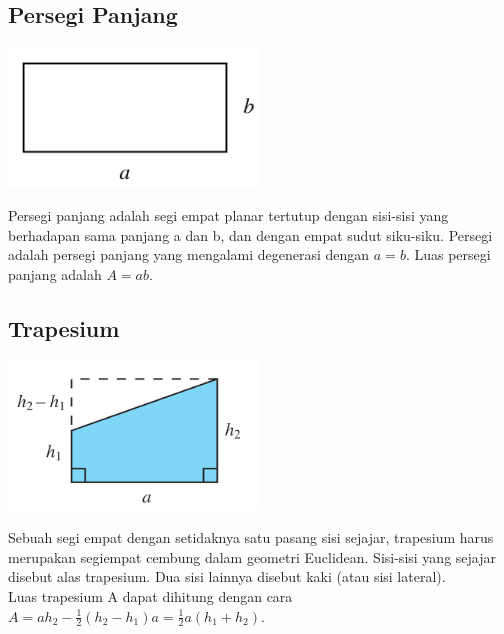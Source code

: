 \subsection{Persegi Panjang}
\begin{center}
	\includegraphics[width=0.50\textwidth]{gambar/persegipanjangpustaka.png}
\end{center}
Persegi panjang adalah segi empat planar tertutup dengan sisi-sisi yang berhadapan sama panjang a dan b, dan dengan empat sudut siku-siku. Persegi adalah persegi panjang yang mengalami degenerasi dengan $a = b$. Luas persegi panjang adalah $A = ab$.\citep{Rectangl23:online}

\subsection{Trapesium}
\begin{center}
	\includegraphics[width=0.50\textwidth]{gambar/trapesiumpustaka.png}
\end{center}
Sebuah segi empat dengan setidaknya satu pasang sisi sejajar, trapesium harus merupakan segiempat cembung dalam geometri Euclidean. Sisi-sisi yang sejajar disebut alas trapesium. Dua sisi lainnya disebut kaki (atau sisi lateral).\citep{RightTra69:online}\\
Luas trapesium A dapat dihitung dengan cara $A = a h_2 - \frac{1}{2} (h_2 - h_1) a = \frac{1}{2} a(h_1 + h_2)$.\citep{RightTra69:online}

